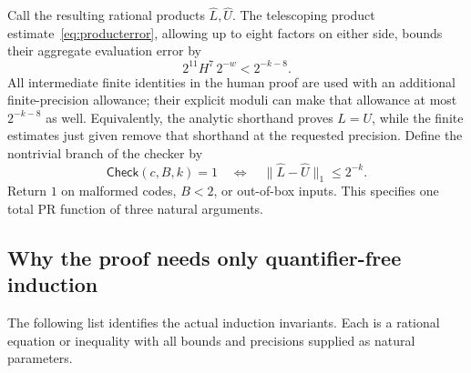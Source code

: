 \documentclass[11pt,letterpaper]{article}
\numberwithin{equation}{section}
\theoremstyle{definition}
\newcommand{\normone}[1]{\lVert #1\rVert_1}
\begin{document}
Call the resulting rational products \(\widehat L,\widehat U\).
The telescoping product estimate~\eqref{eq:producterror}, allowing
up to eight factors on either side, bounds their aggregate
evaluation error by
\begin{equation}
                2^{11}H^7\,2^{-w}<2^{-k-8}.               \label{eq:finalbudget}
\end{equation}
All intermediate finite identities in the human proof are used with
an additional finite-precision allowance; their explicit moduli can
make that allowance at most \(2^{-k-8}\) as well.
Equivalently, the analytic shorthand proves \(L=U\), while the finite
estimates just given remove that shorthand at the requested precision.
Define the nontrivial branch of the checker by
\begin{equation}
 \mathsf{Check}(c,B,k)=1
       \quad\Longleftrightarrow\quad
              \normone{\widehat L-\widehat U}\le2^{-k}.
 \label{eq:Checkdefinition}
\end{equation}
Return \(1\) on malformed codes, \(B<2\), or out-of-box inputs.
This specifies one total PR function of three natural arguments.

\subsection{Why the proof needs only quantifier-free induction}

The following list identifies the actual induction invariants.
Each is a rational equation or inequality with all bounds and
precisions supplied as natural parameters.
\end{document}
